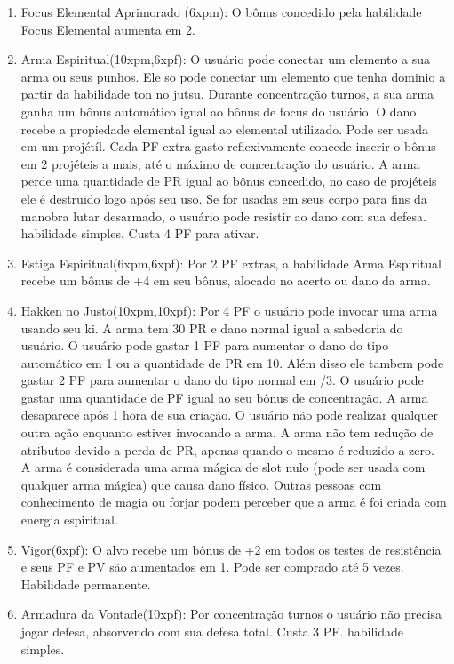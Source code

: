 \begin{enumerate}
 	\item Focus Elemental Aprimorado (6xpm): O bônus concedido pela habilidade Focus Elemental aumenta em 2.
		
	\item Arma Espiritual(10xpm,6xpf): O usuário pode conectar um elemento a sua arma ou seus punhos. Ele so pode conectar um elemento que tenha dominio a partir da habilidade ton no jutsu. Durante concentração turnos, a sua arma ganha um bônus automático igual ao bônus de focus do usuário. O dano recebe a propiedade elemental igual ao elemental utilizado. Pode ser usada em um projétíl. Cada PF extra gasto reflexivamente concede inserir o bônus em 2 projéteis a mais, até o máximo de concentração do usuário. A arma perde uma quantidade de PR igual ao bônus concedido, no caso de projéteis ele é destruido logo após seu uso. Se for usadas em seus corpo para fins da manobra lutar desarmado, o usuário pode resistir ao dano com sua defesa. habilidade simples. Custa 4 PF para ativar.

\item Estiga Espiritual(6xpm,6xpf): Por 2 PF extras, a habilidade Arma Espiritual recebe um bônus de +4 em seu bônus, alocado no acerto ou dano da arma.

\item Hakken no Justo(10xpm,10xpf): Por 4 PF o usuário pode invocar uma arma usando seu ki. A arma tem 30 PR e dano normal igual a sabedoria do usuário. O usuário pode gastar 1 PF para aumentar o dano do tipo automático em 1 ou a quantidade de PR em 10. Além disso ele tambem pode gastar 2 PF para aumentar o dano do tipo normal em /3. O usuário pode gastar uma quantidade de PF igual ao seu bônus de concentração. A arma desaparece após 1 hora de sua criação. O usuário não pode realizar qualquer outra ação enquanto estiver invocando a arma. A arma não tem redução de atributos devido a perda de PR, apenas quando o mesmo é reduzido a zero. A arma é considerada uma arma mágica de slot nulo (pode ser usada com qualquer arma mágica) que causa dano físico. Outras pessoas com conhecimento de magia ou forjar podem perceber que a arma é foi criada com energia espiritual.

	\item Vigor(6xpf): O alvo recebe um bônus de +2 em todos os testes de resistência e seus PF e PV são aumentados em 1. Pode ser comprado até 5 vezes. Habilidade permanente.

	\item Armadura da Vontade(10xpf): Por concentração turnos o usuário não precisa jogar defesa, absorvendo com sua defesa total. Custa 3 PF. habilidade simples.


\end{enumerate}
